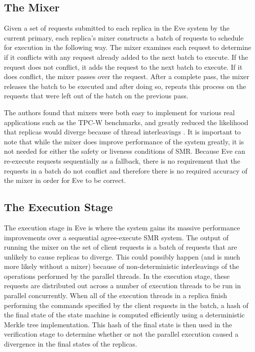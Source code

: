 \documentclass[11pt, oneside]{report}
\begin{document}
\subsection{The Mixer}\label{EveMixer}
Given a set of requests submitted to each replica in the Eve system by the current primary, each replica's mixer constructs a batch of requests to schedule for execution in the following way. 
The mixer examines each request to determine if it conflicts with any request already added to the next batch to execute. 
If the request does not conflict, it adds the request to the next batch to execute. 
If it does conflict, the mixer passes over the request. 
After a complete pass, the mixer releases the batch to be executed and after doing so, repeats this process on the requests that were left out of the batch on the previous pass.

The authors found that mixers were both easy to implement for various real applications such as the TPC-W benchmarks, and greatly reduced the likelihood that replicas would diverge because of thread interleavings \cite{eve}. 
It is important to note that while the mixer does improve performance of the system greatly, it is not needed for either the safety or liveness conditions of SMR. 
Because Eve can re-execute requests sequentially as a fallback, there is no requirement that the requests in a batch do not conflict and therefore there is no required accuracy of the mixer in order for Eve to be correct.

\subsection{The Execution Stage}\label{EveExecution}

The execution stage in Eve is where the system gains its massive performance improvements over a sequential agree-execute SMR system. 
The output of running the mixer on the set of client requests is a batch of requests that are unlikely to cause replicas to diverge. 
This could possibly happen (and is much more likely without a mixer) because of non-deterministic interleavings of the operations performed by the parallel threads.
In the execution stage, these requests are distributed out across a number of execution threads to be run in parallel concurrently. 
When all of the execution threads in a replica finish performing the commands specified by the client requests in the batch, a hash of the final state of the state machine is computed efficiently using a deterministic Merkle tree implementation. 
This hash of the final state is then used in the verification stage to determine whether or not the parallel execution caused a divergence in the final states of the replicas.
\end{document}
